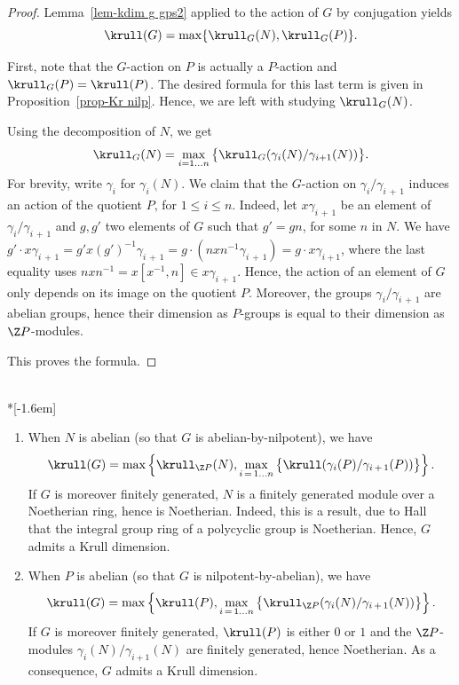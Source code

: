 \begin{proof}
Lemma~\ref{lem-kdim g gps2} applied to the action of $G$ by conjugation yields
\[
\krull(G) = \max\{ \krull_G(N), \krull_G(P)\}.
\]

First, note that the $G$-action on $P$ is actually a $P$-action and $\krull_G(P) = \krull(P)$. The desired formula for this last term is given in Proposition~\ref{prop-Kr nilp}. Hence, we are left with studying $\krull_G(N)$.

Using the decomposition of $N$, we get
\[
\krull_G(N) = \max\limits_{i = 1 \dots n}\big\{ \krull_G(\gamma_i(N)/\gamma_{i+1}(N)) \big\}.
\]
For brevity, write $\gamma_i$ for $\gamma_i(N)$. We claim that the $G$-action on $\gamma_i/\gamma_{i\,+\,1}$ induces an action of the quotient $P$, for $1 \leq i \leq n$. Indeed, let $x\gamma_{i\,+\,1}$ be an element of $\gamma_i/\gamma_{i\,+\,1}$ and $g, g'$ two elements of $G$ such that $g' = gn$, for some $n$ in $N$. We have $g'\cdot x\gamma_{i\,+\,1} = g'x(g')^{-1} \gamma_{i\,+\,1} = g\cdot (nxn^{-1}\gamma_{i\,+\,1}) = g\cdot x\gamma_{i+1}$, where the last equality uses $nxn^{-1} = x[x^{-1}, n] \in x\gamma_{i\,+\,1}$. Hence, the action of an element of $G$ only depends on its image on the quotient $P$. Moreover, the groups $\gamma_i/\gamma_{i\,+\,1}$ are abelian groups, hence their dimension as $P$-groups is equal to their dimension as $\Z P$-modules.

This proves the formula.
\end{proof}

\begin{rema}\label{rem-kd apn npa}\ \\*[-1.6em]
\begin{enumerate}\romanenumi
\item \label{list2.12.1}When $N$ is abelian (so that $G$ is abelian-by-nilpotent), we have
\begin{equation*}
\krull(G) = \max\left\{\krull_{\Z P}(N), \max\limits_{i\,=\,1\dots n} \big\{\krull(\gamma_i(P)/\gamma_{i\,+\,1}(P))\big\}\right\}.
\end{equation*}
If $G$ is moreover finitely generated, $N$ is a finitely generated module over a Noetherian ring, hence is Noetherian. Indeed, this is a result, due to Hall~\cite{Hall54} that the integral group ring of a polycyclic group is Noetherian. Hence, $G$ admits a Krull dimension.
\item \label{list2.12.2}When $P$ is abelian (so that $G$ is nilpotent-by-abelian), we have
\begin{equation*}
\krull(G) = \max \left\{\krull(P), \max\limits_{i\,=\,1 \dots n} \big\{ \krull_{\Z P}(\gamma_i(N)/\gamma_{i\,+\,1}(N)) \big\}\right\}.
\end{equation*}
If $G$ is moreover finitely generated, $\krull(P)$ is either $0$ or $1$ and the $\Z P$-modules $\gamma_i(N)/\gamma_{i +1}(N)$ are finitely generated, hence Noetherian. As a consequence, $G$ admits a Krull dimension.
\end{enumerate}
\end{rema}



